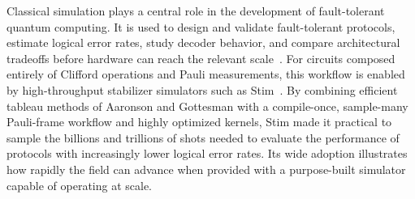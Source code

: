 \documentclass[a4paper, onecolumn, unpublished]{quantumarticle}
\begin{document}
    Classical simulation plays a central role in the development of fault-tolerant quantum computing. It is used to design and validate fault-tolerant protocols, estimate logical error rates, study decoder behavior, and compare architectural tradeoffs before hardware can reach the relevant scale~\cite{bluvsteinFaulttolerantNeutralatomArchitecture2026, google2023suppressing, fowler2012surface, Dennis2002Topological, Higgott2022PyMatching, Bravyi2024}. For circuits composed entirely of Clifford operations and Pauli measurements, this workflow is enabled by high-throughput stabilizer simulators such as Stim~\cite{gidneyStimFastStabilizer2021}. By combining efficient tableau methods of Aaronson and Gottesman \cite{aaronsonImprovedSimulationStabilizer2004} with a compile-once, sample-many Pauli-frame workflow and highly optimized kernels, Stim made it practical to sample the billions and trillions of shots needed to evaluate the performance of protocols with increasingly lower logical error rates. Its wide adoption illustrates how rapidly the field can advance when provided with a purpose-built simulator capable of operating at scale.
\end{document}

